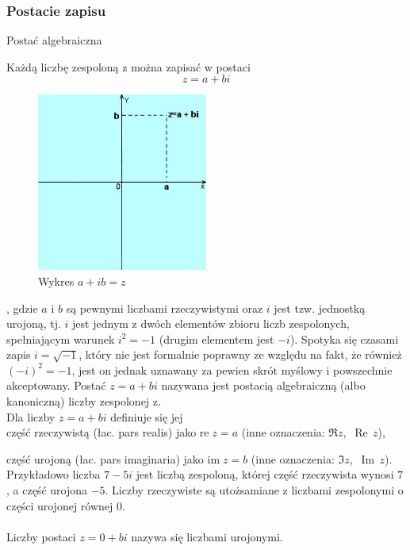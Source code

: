 \documentclass[12pt, a4paper]{article}
\begin{document}
\subsubsection{Postacie zapisu}


\begin{center}\large {Postać algebraiczna}
\end{center}
Każdą liczbę zespoloną z można zapisać w postaci
\begin{equation}
\label{eq:nr1}
	z=a+bi
\end{equation}


\begin{figure}[h]
    \centering
    \includegraphics[width=0.5\textwidth]{wykres.jpg}
    \caption{Wykres $a+ib=z$}
    \label{fig:image1}
\end{figure}

, gdzie $a$ i $b$ są pewnymi liczbami rzeczywistymi oraz $i$ jest tzw. jednostką urojoną, tj. $i$ jest jednym z dwóch elementów zbioru liczb zespolonych, spełniającym warunek $i^2=-1$ (drugim elementem jest $-i$). Spotyka się czasami zapis $i=\sqrt{-1}$, który nie jest formalnie poprawny ze względu na fakt, że również $(-i)^2=-1$, jest on jednak uznawany za pewien skrót myślowy i powszechnie akceptowany.
\newpage
Postać $z=a+bi$ nazywana jest postacią algebraiczną (albo kanoniczną) liczby zespolonej z.\\
Dla liczby $z=a+bi$ definiuje się jej\\


    część rzeczywistą (łac. pars realis) jako $\mathrm{re}\;z = a$ (inne oznaczenia: $\Re z$,\, $\operatorname{Re}\, z$),
    
		część urojoną (łac. pars imaginaria) jako $\mathrm{im}\;z = b$ (inne oznaczenia: $\Im z$,\, $\operatorname{Im}\, z$).
\\

Przykładowo liczba $7 - 5i$ jest liczbą zespoloną, której część rzeczywista wynosi $7$, a część urojona $-5$. Liczby rzeczywiste są utożsamiane z liczbami zespolonymi o części urojonej równej $0$.
\\\\
Liczby postaci $z = 0 + bi$ nazywa się liczbami urojonymi.
\end{document}
